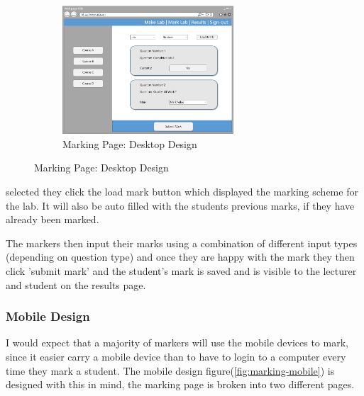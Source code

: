 \documentclass[12pt]{article}  %
\begin{document}
\begin{figure}
\vspace*{-\baselineskip}
\begin{figure}[H]
    \centering
    \includegraphics[width=0.7\textwidth]{images/design/marking-desktop.png}
    \caption{Marking Page: Desktop Design}
    \label{fig:design-marking-pc}
\end{figure}
\end{figure}

\noindent selected they click the load mark button which displayed the marking scheme for the lab. It will also be auto filled with the students previous marks, if they have already been marked.

The markers then input their marks using a combination of different input types (depending on question type) and once they are happy with the mark they then click 'submit mark' and the student's mark is saved and is visible to the lecturer and student on the results page.


\newpage
\subsubsection*{Mobile Design}

I would expect that a majority of markers will use the mobile devices to mark, since it easier carry a mobile device than to have to login to a computer every time they mark a student. The mobile design figure(\ref{fig:marking-mobile}) is designed with this in mind, the marking page is broken into two different pages.
\end{document}

